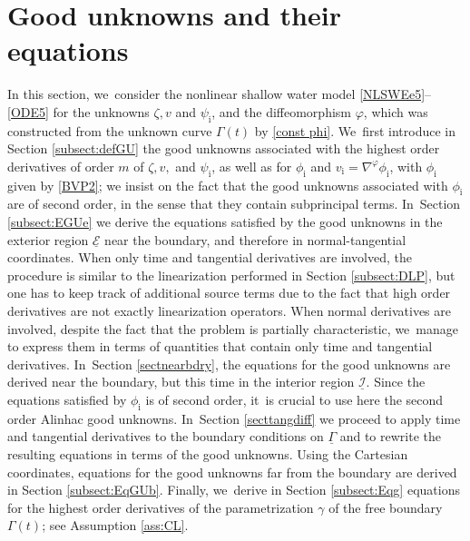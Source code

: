\documentclass[11pt]{article}
\newcommand{\cI}{{\mathcal I}}
\newcommand{\cE}{{\mathcal E}}
\newcommand{\ul}[1]{\underline{#1}}
\newcommand{\itGamma}{\mathit{\Gamma}}
\theoremstyle{definition}
\begin{document}
\section{Good unknowns and their equations}\label{sect:GU}
In this section, we~consider the nonlinear shallow water model \eqref{NLSWEe5}--\eqref{ODE5} for the unknowns $\zeta,v$ and $\psi_\mathrm{i}$,
and the diffeomorphism $\varphi$, which was constructed from the unknown curve $\itGamma(t)$ by \eqref{const phi}. We~first introduce in Section \ref{subsect:defGU} the good unknowns associated with the highest order derivatives of order $m$ of
$\zeta,v,$ and $\psi_\mathrm{i}$, as well as for $\phi_\mathrm{i}$ and $v_\mathrm{i}=\nabla^\varphi \phi_\mathrm{i}$, with $\phi_\mathrm{i}$ given by \eqref{BVP2};
we insist on the fact that the good unknowns associated with $\phi_\mathrm{i}$ are of second order, in the sense that they contain subprincipal terms. In~Section \ref{subsect:EGUe} we derive the equations satisfied by the good unknowns in the exterior region $\ul{\cE}$ near the boundary,
and therefore in normal-tangential coordinates.
When only time and tangential derivatives are involved, the procedure is similar to the linearization performed in Section \ref{subsect:DLP},
but one has to keep track of additional source terms due to the fact that high order derivatives are not exactly linearization operators.
When normal derivatives are involved, despite the fact that the problem is partially characteristic, we~manage to express them in terms of quantities that contain only time and tangential derivatives. In~Section \ref{sectnearbdry}, the equations for the good unknowns are derived near the boundary, but this time in the interior region $\ul{\cI}$.
Since the equations satisfied by $\phi_\mathrm{i}$ is of second order, it~is crucial to use here the second order Alinhac good unknowns. In~Section \ref{secttangdiff} we proceed to apply time and tangential derivatives to the boundary conditions on $\ul{\itGamma}$
and to rewrite the resulting equations in terms of the good unknowns.
Using the Cartesian coordinates, equations for the good unknowns far from the boundary are derived in Section \ref{subsect:EqGUb}.
Finally, we~derive in Section \ref{subsect:Eqg} equations for the highest order derivatives of the parametrization $\gamma$ of the free boundary $\itGamma(t)$;
see Assumption \ref{ass:CL}.
\end{document}
